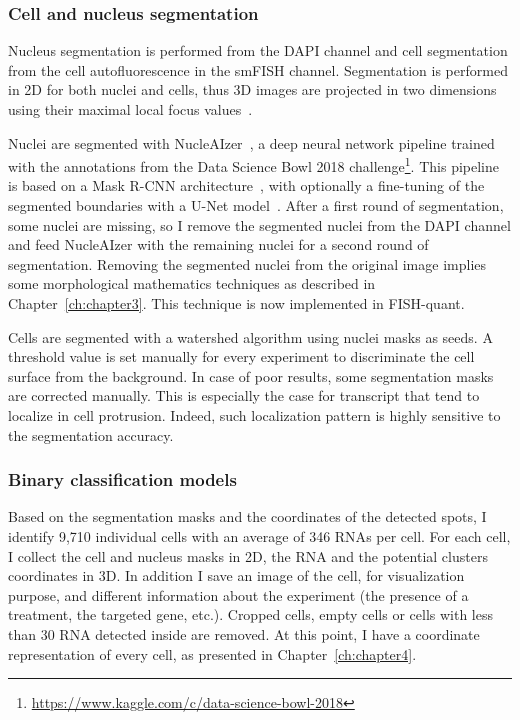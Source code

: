 \subsubsection{Cell and nucleus segmentation}

Nucleus segmentation is performed from the DAPI channel and cell segmentation from the cell autofluorescence in the \ac{smFISH} channel.
Segmentation is performed in 2D for both nuclei and cells, thus 3D images are projected in two dimensions using their maximal local focus values~\cite{tsanov_smifish_2016}.

Nuclei are segmented with NucleAIzer~\cite{hollandi_nucleaizer_2020}, a deep neural network pipeline trained with the annotations from the Data Science Bowl 2018 challenge\footnote{\url{https://www.kaggle.com/c/data-science-bowl-2018}}.
This pipeline is based on a Mask R-CNN architecture~\cite{He_2017_ICCV}, with optionally a fine-tuning of the segmented boundaries with a U-Net model~\cite{Ronneberger_unet}.
After a first round of segmentation, some nuclei are missing, so I remove the segmented nuclei from the DAPI channel and feed NucleAIzer with the remaining nuclei for a second round of segmentation.
Removing the segmented nuclei from the original image implies some morphological mathematics techniques as described in Chapter~\ref{ch:chapter3}.
This technique is now implemented in FISH-quant.

Cells are segmented with a watershed algorithm using nuclei masks as seeds.
A threshold value is set manually for every experiment to discriminate the cell surface from the background.
In case of poor results, some segmentation masks are corrected manually.
This is especially the case for transcript that tend to localize in cell protrusion.
Indeed, such localization pattern is highly sensitive to the segmentation accuracy.

\subsubsection{Binary classification models}

Based on the segmentation masks and the coordinates of the detected spots, I identify 9,710 individual cells with an average of 346 \ac{RNA}s per cell.
For each cell, I collect the cell and nucleus masks in 2D, the \ac{RNA} and the potential clusters coordinates in 3D.
In addition I save an image of the cell, for visualization purpose, and different information about the experiment (the presence of a treatment, the targeted gene, etc.).
Cropped cells, empty cells or cells with less than 30 \ac{RNA} detected inside are removed.
At this point, I have a coordinate representation of every cell, as presented in Chapter~\ref{ch:chapter4}.

